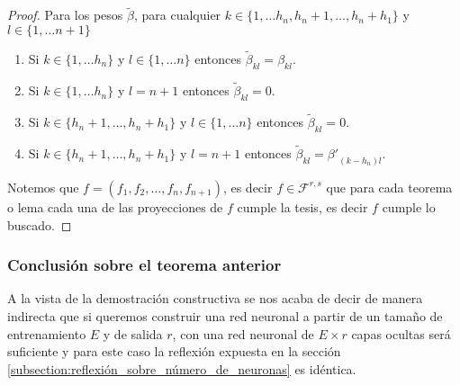 \begin{proof}
    Para los pesos $\tilde{\beta}$, para cualquier
    $k \in \{1, \ldots h_n, h_{n} + 1, \ldots, h_n + h_1\}$ y  
    $l \in \{1, \ldots n+1 \}$ 
    \begin{enumerate}
        \item Si $k \in \{1, \ldots h_n \}$ y $l \in \{1, \ldots n\}$ 
        entonces $\tilde{\beta}_{k l} = \beta_{k l}.$
        \item Si $k \in \{1, \ldots h_n \}$ y $l=n+1$ 
        entonces $\tilde{\beta}_{k l} = 0.$
        \item Si $k \in \{h_{n} + 1, \ldots, h_n + h_1 \}$ 
        y $l \in \{1, \ldots n\}$ 
        entonces $\tilde{\beta}_{k l} = 0.$
        \item Si $k \in \{h_{n} + 1, \ldots, h_n + h_1 \}$ 
        y $l=n+1$ 
        entonces 
        $\tilde{\beta}_{k l} = {\beta '}_{(k- h_n) l}.$
    \end{enumerate}

    Notemos que $f=(f_1, f_2, \ldots, f_n, f_{n+1})$, es decir $f \in \mathcal{F}^{r,s}$ que para cada teorema o lema
    cada una de las proyecciones de $f$ cumple la tesis, es decir $f$ cumple lo buscado. 
\end{proof}

\subsubsection*{ Conclusión sobre el teorema anterior}  
A la vista de la demostración constructiva se nos acaba de decir de manera indirecta que si queremos construir una red neuronal 
a partir de un tamaño de entrenamiento $E$ y de salida $r$, 
con una red neuronal de $E \times r$ capas ocultas será suficiente y para este caso la reflexión expuesta en la sección \ref{subsection:reflexión_sobre_número_de_neuronas} es idéntica. 


